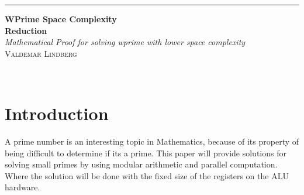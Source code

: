 \documentclass[12pt, oneside, onecolumn]{article}
\begin{document}
\begin{titlepage} %
	
	\raggedleft %
	
	\rule{1pt}{\textheight} %
	\hspace{0.05\textwidth} %
	\parbox[b]{0.75\textwidth}{ %
		
		{\Huge\bfseries WPrime Space Complexity\\  Reduction}\\[2\baselineskip] %
		{\large\textit{Mathematical Proof for solving wprime with lower space complexity}}\\[4\baselineskip] %
		{\Large\textsc{Valdemar Lindberg}} %
		
		\vspace{0.5\textheight} %
		
		{\noindent }\\[\baselineskip] %
	}

\end{titlepage}

\newpage
{} %

\tableofcontents
\newpage
{} %

% 
\section{Introduction}
A prime number is an interesting topic in Mathematics, because of its property of being difficult to determine if its a prime. This paper will provide solutions for solving small primes by using modular arithmetic and parallel computation. Where the solution will be done with the fixed size of the registers on the ALU hardware.
\end{document}
